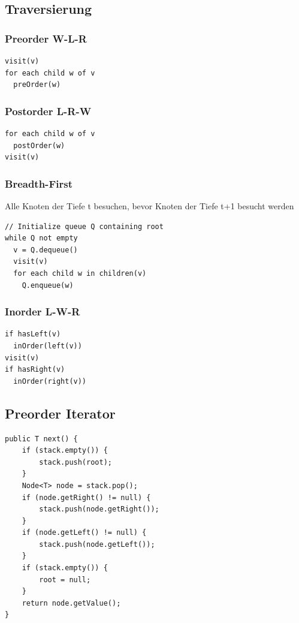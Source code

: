 \begin{multicols*}{4}
	\subsection{Traversierung}
		\subsubsection{Preorder W-L-R}
			\begin{lstlisting}
visit(v)
for each child w of v
  preOrder(w)
			\end{lstlisting}
		
		\subsubsection{Postorder L-R-W}
			\begin{lstlisting}
for each child w of v
  postOrder(w)
visit(v)
			\end{lstlisting}
		
		\subsubsection{Breadth-First}
		Alle Knoten der Tiefe t besuchen, bevor Knoten der Tiefe t+1 besucht werden
			\begin{lstlisting}
// Initialize queue Q containing root
while Q not empty
  v = Q.dequeue()
  visit(v)
  for each child w in children(v)
    Q.enqueue(w)
			\end{lstlisting}
		
		\subsubsection{Inorder L-W-R}
			\begin{lstlisting}
if hasLeft(v)
  inOrder(left(v))
visit(v)
if hasRight(v)
  inOrder(right(v))
			\end{lstlisting}

	\subsection{Preorder Iterator}
		\begin{lstlisting}
public T next() {
	if (stack.empty()) {
		stack.push(root);
	}
	Node<T> node = stack.pop();
	if (node.getRight() != null) {
		stack.push(node.getRight());
	}
	if (node.getLeft() != null) {
		stack.push(node.getLeft());
	}
	if (stack.empty()) {
		root = null;
	}
	return node.getValue(); 
}
		\end{lstlisting}


\end{multicols*}
